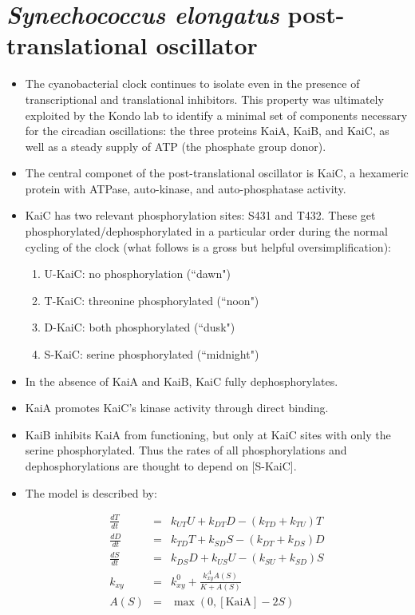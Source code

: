 \documentclass{article}
\begin{document}
\section*{\textit{Synechococcus elongatus} post-translational oscillator}

\begin{itemize}
\item The cyanobacterial clock continues to isolate even in the presence of transcriptional and translational inhibitors. This property was ultimately exploited by the Kondo lab to identify a minimal set of components necessary for the circadian oscillations: the three proteins KaiA, KaiB, and KaiC, as well as a steady supply of ATP (the phosphate group donor).

\item The central componet of the post-translational oscillator is KaiC, a hexameric protein with ATPase, auto-kinase, and auto-phosphatase activity.
\item KaiC has two relevant phosphorylation sites: S431 and T432. These get phosphorylated/dephosphorylated in a particular order during the normal cycling of the clock (what follows is a gross but helpful oversimplification):
\begin{enumerate}
\item U-KaiC: no phosphorylation (``dawn")
\item T-KaiC: threonine phosphorylated (``noon")
\item D-KaiC: both phosphorylated (``dusk")
\item S-KaiC: serine phosphorylated (``midnight")
\end{enumerate}
\item In the absence of KaiA and KaiB, KaiC fully dephosphorylates.
\item KaiA promotes KaiC's kinase activity through direct binding.
\item KaiB inhibits KaiA from functioning, but only at KaiC sites with only the serine phosphorylated. Thus the rates of all phosphorylations and dephosphorylations are thought to depend on [S-KaiC].
\item The model is described by:

\begin{eqnarray*}
\frac{dT}{dt} & = & k_{UT} U + k_{DT} D -\left(  k_{TD} + k_{TU} \right) T\\ 
\frac{dD}{dt} & = & k_{TD} T + k_{SD} S - \left(k_{DT} + k_{DS} \right) D\\
\frac{dS}{dt} & = &k_{DS} D +  k_{US} U - \left( k_{SU} + k_{SD} \right) S\\
k_{xy} & = & k_{xy}^0 + \frac{k_{xy}^A A(S)}{K + A(S)}\\
A(S) & = & \max \left(0, \left[ \textrm{KaiA} \right] - 2 S \right)
\end{eqnarray*}


\end{itemize}
\end{document}
